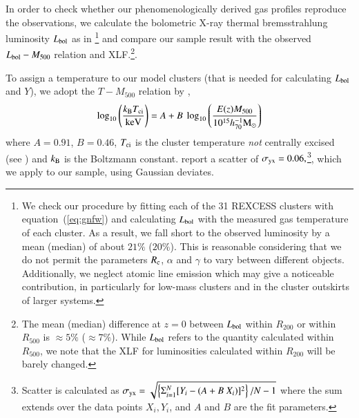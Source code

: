 \documentclass[traditabstract]{aa}
\begin{document}
In order to check whether our phenomenologically derived gas profiles reproduce
the observations, we calculate the bolometric X-ray thermal bremsstrahlung
luminosity $L_{\rm{bol}}$ as in \cite{1988xrec.book.....S}\footnote[5]{We check
  our procedure by fitting each of the 31 REXCESS clusters with
  equation~(\ref{eq:gnfw}) and calculating $L_{\rm{bol}}$ with the measured gas
  temperature of each cluster. As a result, we fall short to the observed
  luminosity by a mean (median) of about $21\%$ ($20\%$). This is reasonable
  considering that we do not permit the parameters $R_{\rm{c}}$, $\alpha$ and
  $\gamma$ to vary between different objects. Additionally, we neglect atomic
  line emission which may give a noticeable contribution, in particularly for
  low-mass clusters and in the cluster outskirts of larger systems.}  and
compare our sample result with the observed $L_{\rm{bol}} - M_{500}$ relation
and XLF.\footnote[6]{The mean (median) difference at $z=0$ between
  $L_{\rm{bol}}$ within $R_{200}$ or within $R_{500}$ is $\approx 5\%$ ($\approx
  7\%$). While $L_{\rm{bol}}$ refers to the quantity calculated within
  $R_{500}$, we note that the XLF for luminosities calculated within $R_{200}$
  will be barely changed.}.

To assign a temperature to our model clusters (that is needed for calculating
$L_{\rm{bol}}$ and $Y$), we adopt the $T-M_{500}$ relation by
\cite{2010MNRAS.406.1773M},
\begin{equation}
\log_{10} \left( \frac{k_{\rm{B}}T_{\rm{ci}}}{\rm{keV}} \right) = 
A + B~\log_{10} \left( \frac{E(z) M_{500}}{10^{15} h_{70}^{-1} \rm{M_{\odot}}} \right)
\label{eq:temp}
\end{equation}
where $A=0.91$, $B=0.46$, $T_{\rm{ci}}$ is the cluster temperature \emph{not}
centrally excised (see \citealp{2010MNRAS.406.1773M}) and $k_{\rm{B}}$ is the
Boltzmann constant. \cite{2010MNRAS.406.1773M} report a scatter of
$\sigma_{\rm{yx}} = 0.06,$\footnote[7]{Scatter is calculated as
  $\sigma_{\rm{yx}} = \sqrt{ \left\{ \Sigma_{i=1}^{N} [Y_{i}-(A+B~X_{i})]^{2}\right\} /
    N-1}$ where the sum extends over the data points $X_{i}, Y_{i}$, and $A$ and $B$
  are the fit parameters.}, which we apply to our sample, using Gaussian
deviates.
\end{document}
